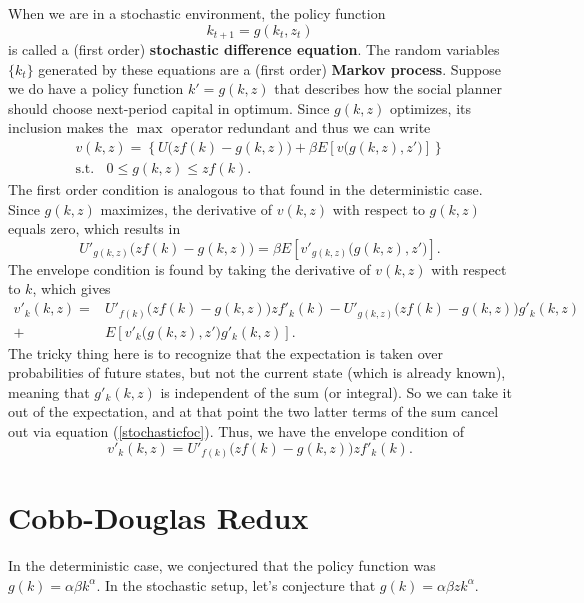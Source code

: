 \documentclass[12pt]{article}
\theoremstyle{definition}
\begin{document}
When we are in a stochastic environment, the policy function
	\[k_{t+1} = g(k_t, z_t)\]
is called a (first order) \textbf{stochastic difference equation}. The random variables $\{k_t\}$ generated by these equations are a (first order) \textbf{Markov process}.  Suppose we do have a policy function $k'=g(k,z)$ that describes how the social planner should choose next-period capital in optimum. Since $g(k,z)$ optimizes, its inclusion makes the $\max$ operator redundant and thus we can write
\begin{align}
	v(k,z) =	\left \{ U\big(zf(k) - g(k,z)\big) + \beta E\left[v\big(g(k,z), z'\big) \right]\right \}\\
	\text{s.t. } \;\; 0 \leq g(k,z) \leq zf(k).
\end{align}
The first order condition is analogous to that found in the deterministic case. Since $g(k,z)$ maximizes, the derivative of $v(k,z)$ with respect to $g(k,z)$ equals zero, which results in
\begin{equation}
	U'_{g(k,z)} \big( zf(k) - g(k,z) \big)	= \beta E\left[ v'_{g(k,z)}\big(g(k,z),z' \big) \right].	\label{stochasticfoc}
	\end{equation}
The envelope condition is found by taking the derivative of $v(k,z)$ with respect to $k$, which gives 
\begin{align*}
	v'_k(k, z) = 	&U'_{f(k)}\big(zf(k) - g(k,z) \big)zf'_k(k) -U'_{g(k,z)}\big(zf(k) - g(k,z) \big)g'_k(k,z)\\
	 + &E\left[v'_k\big(g(k,z), z'\big)g'_k(k,z) \right].  
\end{align*}
The tricky thing here is to recognize that the expectation is taken over probabilities of future states, but not the current state (which is already known), meaning that $g'_k(k,z)$ is independent of the sum (or integral). So we can take it out of the expectation, and at that point the two latter terms of the sum cancel out via equation (\ref{stochasticfoc}). Thus, we have the envelope condition of
\begin{equation}
	v'_k(k, z) = 	U'_{f(k)}\big(zf(k) - g(k,z) \big)zf'_k(k). \label{stochasticenvelope}
\end{equation}



\section{Cobb-Douglas Redux}


In the deterministic case, we conjectured that the policy function was $g(k)=\alpha \beta k^{\alpha}$. In the stochastic setup, let's conjecture that $g(k)= \alpha \beta zk^{\alpha}$. 
\end{document}
